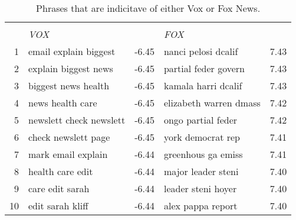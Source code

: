 \begin{table}[H]
\caption{Phrases that are indicitave of either Vox or Fox News.}
\label{tab:vox_fox}
\centering
\begin{tabular}{rlr|lr}
  \hline
  &        &        &         &        \\
 & \textit{VOX} &  & \textit{FOX} &  \\ 
  \hline
  1 & email explain biggest & -6.45 & nanci pelosi dcalif & 7.43 \\ 
  2 & explain biggest news & -6.45 & partial feder govern & 7.43 \\ 
  3 & biggest news health & -6.45 & kamala harri dcalif & 7.43 \\ 
  4 & news health care & -6.45 & elizabeth warren dmass & 7.42 \\ 
  5 & newslett check newslett & -6.45 & ongo partial feder & 7.42 \\ 
  6 & check newslett page & -6.45 & york democrat rep & 7.41 \\ 
  7 & mark email explain & -6.44 & greenhous ga emiss & 7.41 \\ 
  8 & health care edit & -6.44 & major leader steni & 7.40 \\ 
  9 & care edit sarah & -6.44 & leader steni hoyer & 7.40 \\ 
  10 & edit sarah kliff & -6.44 & alex pappa report & 7.40 \\ 
   \hline
\end{tabular}
\end{table}
